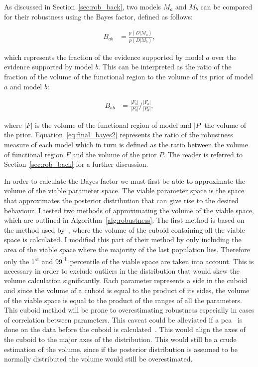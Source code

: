 As discussed in Section~\ref{sec:rob_back}, two models $M_a$ and $M_b$ can be compared for their robustness using the Bayes factor, defined as follows:

\begin{align}
 B_{ab} &= \frac{p(D|M_a)}{p(D|M_b)}, \label{eq:final_bayes1}
\end{align}	

\noindent which represents the fraction of the evidence supported by model $a$ over the evidence supported by model $b$. This can be interpreted as the ratio of the fraction of the volume of the functional region to the volume of its prior of model $a$ and model $b$:

\begin{align}
 B_{ab} &= \frac{|F_a|}{|P_a|} / \frac{|F_b|}{|P_b|}, \label{eq:final_bayes2}
\end{align}	

\noindent where $|F|$ is the volume of the functional region of model and $|P|$ the volume of the prior. Equation~\ref{eq:final_bayes2} represents the ratio of the robustness measure of each model which in turn is defined as the ratio between the volume of functional region $F$ and the volume of the prior $P$. The reader is referred to Section~\ref{sec:rob_back} for a further discussion.

In order to calculate the Bayes factor we must first be able to approximate the volume of the viable parameter space. The viable parameter space is the space that approximates the posterior distribution that can give rise to the desired behaviour. I tested two methods of approximating the volume of the viable space, which are outlined in Algorithm~\ref{alg:robustness}. The first method is based on the method used by~\autocite{Hafner:2009ct}, where the volume of the cuboid containing all the viable space is calculated. I modified this part of their method by only including the area of the viable space where the majority of the last population lies. Therefore only the 1\textsuperscript{st} and 99\textsuperscript{th} percentile of the viable space are taken into account. This is necessary in order to exclude outliers in the distribution that would skew the volume calculation significantly. Each parameter represents a side in the cuboid and since the volume of a cuboid is equal to the product of its sides, the volume of the viable space is equal to the product of the ranges of all the parameters. This cuboid method will be prone to overestimating robustness especially in cases of correlation between parameters. This caveat could be alleviated if a \acrfull{pca}~\autocite{Fukunaga:2013wt} is done on the data before the cuboid is calculated~\autocite{Hafner:2009ct}. This would align the axes of the cuboid to the major axes of the distribution. This would still be a crude estimation of the volume, since if the posterior distribution is assumed to be normally distributed the volume would still be overestimated. 

